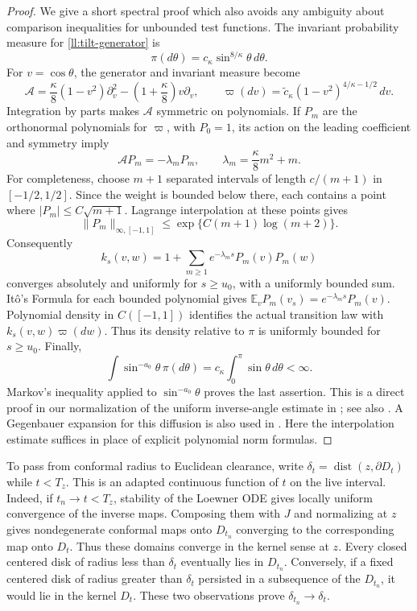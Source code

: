 \begin{proof}
We give a short spectral proof which also avoids any ambiguity about
comparison inequalities for unbounded test functions. The invariant
probability measure for \eqref{ll:tilt-generator} is
\[
 \pi(d\theta)=c_\kappa\sin^{8/\kappa}\theta\,d\theta.
\]
For $v=\cos\theta$, the generator and invariant measure become
\[
 \mathcal A=\frac\kappa8(1-v^2)\partial_v^2
                   -\left(1+\frac\kappa8\right)v\partial_v,
 \qquad
 \varpi(dv)=\widetilde c_\kappa
                     (1-v^2)^{4/\kappa-1/2}\,dv.
\]
Integration by parts makes $\mathcal A$ symmetric on polynomials.
If $P_m$ are the orthonormal polynomials for $\varpi$, with $P_0=1$,
its action on the leading coefficient and symmetry imply
\[
 \mathcal AP_m=-\lambda_mP_m,
 \qquad \lambda_m=\frac\kappa8m^2+m.
\]
For completeness, choose $m+1$ separated intervals of length
$c/(m+1)$ in $[-1/2,1/2]$. Since the weight is bounded below there,
each contains a point where $|P_m|\le C\sqrt{m+1}$.
Lagrange interpolation at these points gives
\[
 \|P_m\|_{\infty,[-1,1]}
          \le \exp\{C(m+1)\log(m+2)\}.
\]
Consequently
\[
 k_s(v,w)=1+\sum_{m\ge1}e^{-\lambda_ms}P_m(v)P_m(w)
\]
converges absolutely and uniformly for $s\ge u_0$, with a uniformly
bounded sum. It\^o's Formula for each bounded polynomial gives
$\mathbb E_vP_m(v_s)=e^{-\lambda_ms}P_m(v)$.
Polynomial density in $C([-1,1])$ identifies the actual transition
law with $k_s(v,w)\varpi(dw)$. Thus its density relative to $\pi$
is uniformly bounded for $s\ge u_0$. Finally,
\[
 \int\sin^{-a_0}\theta\,\pi(d\theta)
      =c_\kappa\int_0^\pi\sin\theta\,d\theta<\infty.
\]
Markov's inequality applied to $\sin^{-a_0}\theta$ proves the last
assertion.  This is a direct proof in our normalization of the uniform
inverse-angle estimate in \cite[Lemma~2.9]{lawlerwerness2013}; see also
\cite[Lemma~2.2]{lawlerzhou2013}.
A Gegenbauer expansion for this diffusion is also used in
\cite[Proposition~4.2]{zhan2019optimal}. Here the interpolation estimate
suffices in place of explicit polynomial norm formulas.
\end{proof}

To pass from conformal radius to Euclidean clearance, write
$\delta_t=\operatorname{dist}(z,\partial D_t)$ while $t<T_z$.
This is an adapted continuous function of $t$ on the live interval.
Indeed, if $t_n\to t<T_z$, stability of the Loewner ODE gives locally
uniform convergence of the inverse maps.  Composing them with $J$ and
normalizing at $z$ gives nondegenerate conformal maps onto $D_{t_n}$
converging to the corresponding map onto $D_t$.  Thus these domains
converge in the kernel sense at $z$.  Every closed centered disk of
radius less than $\delta_t$ eventually lies in $D_{t_n}$.  Conversely,
if a fixed centered disk of radius greater than $\delta_t$ persisted
in a subsequence of the $D_{t_n}$, it would lie in the kernel $D_t$.
These two observations prove $\delta_{t_n}\to\delta_t$.

